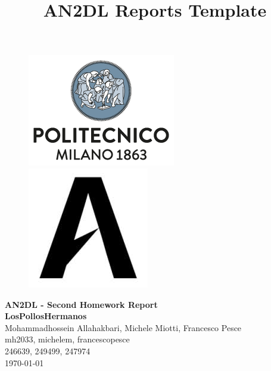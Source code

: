 \documentclass[11pt]{article}
\title{AN2DL Reports Template}
\begin{document}
\begin{figure}[H]
      \raggedright
      \includegraphics[scale=0.4]{polimi.png} \hfill
      \includegraphics[scale=0.3]{airlab.jpeg}
\end{figure}

\vspace{5mm}

\begin{center}
      {\Large \textbf{AN2DL - Second Homework Report}}\\
      \vspace{2mm}
      {\Large \textbf{LosPollosHermanos}}\\
      \vspace{2mm}
      {\large Mohammadhossein Allahakbari,}
      {\large Michele Miotti,}
      {\large Francesco Pesce}\\
      \vspace{2mm}
      {mh2033,}
      {michelem,}
      {francescopesce}\\
      \vspace{2mm}
      {246639,}
      {249499,}
      {247974}\\
      \vspace{5mm}
      \today
\end{center}
\vspace{5mm}
\end{document}
